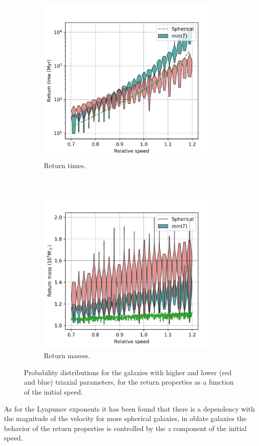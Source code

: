 	\begin{figure}[h]
		\centering
		\begin{subfigure}[t]{0.49\textwidth}
			\includegraphics[width = \linewidth]{"../Files/Week 13/rt_speed"}
			\caption{Return times.}
			\label{fig: timeSpeedDist}
		\end{subfigure}
		~ 
		\begin{subfigure}[t]{0.49\textwidth}
			\includegraphics[width = \linewidth]{"../Files/Week 13/rt_mass"}
			\caption{Return masses.}
			\label{fig: massSpeedDist}
		\end{subfigure}
		\caption{Probability distributions for the galaxies with higher and lower (red and blue) triaxial parameters, for the return properties as a function of the initial speed.}
		\label{fig: correlation}
	\end{figure}
	As for the Lyapunov exponents it has been found that there is a dependency with the magnitude of the velocity for more spherical galaxies, in oblate galaxies the behavior of the return properties is controlled by the $z$ component of the initial speed.
	
